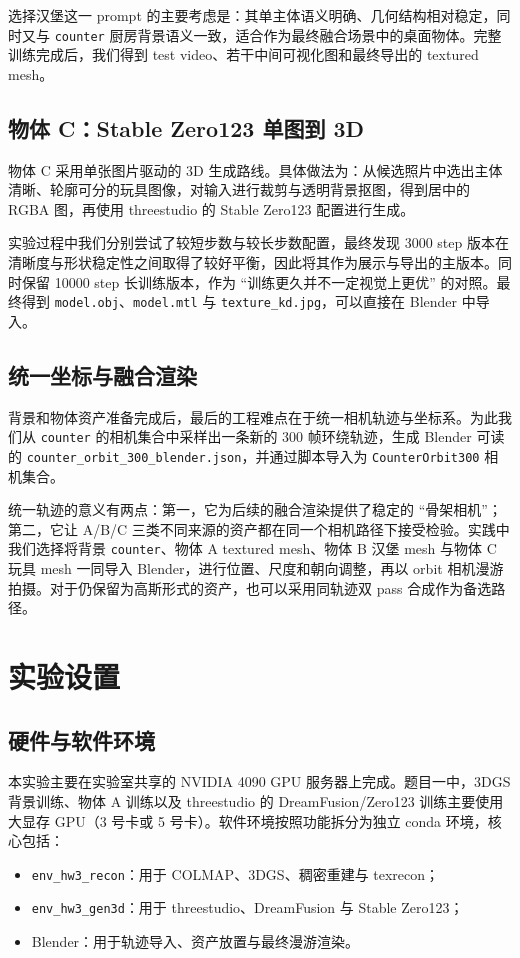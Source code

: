 \documentclass[UTF8,a4paper,11pt]{ctexart}
\begin{document}
选择汉堡这一 prompt 的主要考虑是：其单主体语义明确、几何结构相对稳定，同时又与 \texttt{counter} 厨房背景语义一致，适合作为最终融合场景中的桌面物体。完整训练完成后，我们得到 test video、若干中间可视化图和最终导出的 textured mesh。

\subsection{物体 C：Stable Zero123 单图到 3D}

物体 C 采用单张图片驱动的 3D 生成路线。具体做法为：从候选照片中选出主体清晰、轮廓可分的玩具图像，对输入进行裁剪与透明背景抠图，得到居中的 RGBA 图，再使用 threestudio 的 Stable Zero123 配置进行生成。

实验过程中我们分别尝试了较短步数与较长步数配置，最终发现 3000 step 版本在清晰度与形状稳定性之间取得了较好平衡，因此将其作为展示与导出的主版本。同时保留 10000 step 长训练版本，作为 ``训练更久并不一定视觉上更优'' 的对照。最终得到 \texttt{model.obj}、\texttt{model.mtl} 与 \texttt{texture\_kd.jpg}，可以直接在 Blender 中导入。

\subsection{统一坐标与融合渲染}

背景和物体资产准备完成后，最后的工程难点在于统一相机轨迹与坐标系。为此我们从 \texttt{counter} 的相机集合中采样出一条新的 300 帧环绕轨迹，生成 Blender 可读的 \texttt{counter\_orbit\_300\_blender.json}，并通过脚本导入为 \texttt{CounterOrbit300} 相机集合。

统一轨迹的意义有两点：第一，它为后续的融合渲染提供了稳定的 ``骨架相机''；第二，它让 A/B/C 三类不同来源的资产都在同一个相机路径下接受检验。实践中我们选择将背景 \texttt{counter}、物体 A textured mesh、物体 B 汉堡 mesh 与物体 C 玩具 mesh 一同导入 Blender，进行位置、尺度和朝向调整，再以 orbit 相机漫游拍摄。对于仍保留为高斯形式的资产，也可以采用同轨迹双 pass 合成作为备选路径。

\section{实验设置}

\subsection{硬件与软件环境}

本实验主要在实验室共享的 NVIDIA 4090 GPU 服务器上完成。题目一中，3DGS 背景训练、物体 A 训练以及 threestudio 的 DreamFusion/Zero123 训练主要使用大显存 GPU（3 号卡或 5 号卡）。软件环境按照功能拆分为独立 conda 环境，核心包括：
\begin{itemize}[itemsep=2pt]
  \item \texttt{env\_hw3\_recon}：用于 COLMAP、3DGS、稠密重建与 texrecon；
  \item \texttt{env\_hw3\_gen3d}：用于 threestudio、DreamFusion 与 Stable Zero123；
  \item Blender：用于轨迹导入、资产放置与最终漫游渲染。
\end{itemize}
\end{document}
